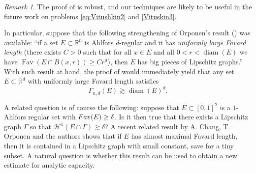 \documentclass[11pt,reqno]{amsart}
\DeclareMathOperator{\diam}{diam}
\theoremstyle{definition}
\theoremstyle{remark}
\newtheorem{remark}[theorem]{Remark}
\numberwithin{equation}{section}
\newcommand{\R}{\mathbb{R}}
\DeclareMathOperator{\Fav}{Fav}
\theoremstyle{theorem}
\theoremstyle{definition}
\theoremstyle{remark}
\numberwithin{equation}{section}
\begin{document}
	\begin{remark}
		The proof of  is robust, and our techniques are likely to be useful in the future work on problems \eqref{eq:Vitushkin2} and \eqref{Vituskin3}. 
		
		In particular, suppose that the following strengthening of Orponen's result () was available: ``if a set $E\subset\R^n$ is Ahlfors $d$-regular and it has \emph{uniformly large Favard length} (there exists $C>0$ such that for all $x\in E$ and all $0<r<\diam(E)$ we have $\Fav(E\cap B(x,r))\ge Cr^d$), then $E$ has big pieces of Lipschitz graphs.'' With such result at hand, the proof of  would immediately yield that any set $E\subset\R^d$ with uniformly large Favard length satisfies
		\begin{equation*}
		\Gamma_{n,d}(E)\gtrsim \diam(E)^d.
		\end{equation*}
	\end{remark}
	A related question is of course the following: suppose that $E \subset [0,1]^2$ is a $1$-Ahlfors regular set with ${\rm Fav}(E) \geq \delta$. Is it then true that there exists a Lipschitz graph $\Gamma$ so that $\mathcal{H}^1(E \cap \Gamma) \gtrsim \delta$? A recent related result by A. Chang, T. Orponen and the authors \cite{chang2022maxfav} shows that if $E$ has almost maximal Favard length, then it is contained in a Lipschitz graph with small constant, save for a tiny subset. A natural question is whether this result can be used to obtain a new estimate for analytic capacity.
\end{document}

